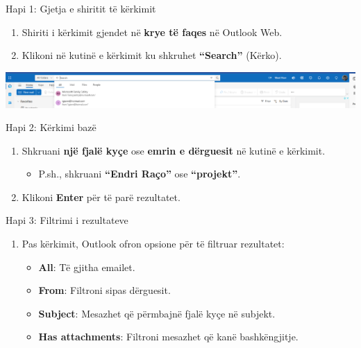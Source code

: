 \documentclass[
  ignorenonframetext,
]{beamer}
\providecommand{\tightlist}{%
  \setlength{\itemsep}{0pt}\setlength{\parskip}{0pt}}
\begin{document}
\begin{frame}{Hapi 1: Gjetja e shiritit të kërkimit}
\label{hapi-1-gjetja-e-shiritit-tuxeb-kuxebrkimit}
\begin{enumerate}
\item
  Shiriti i kërkimit gjendet në \textbf{krye të faqes} në Outlook Web.
\item
  Klikoni në kutinë e kërkimit ku shkruhet \textbf{``Search''} (Kërko).
\end{enumerate}

\includegraphics{./images/outlook18.png}
\end{frame}

\begin{frame}{Hapi 2: Kërkimi bazë}
\label{hapi-2-kuxebrkimi-bazuxeb}
\begin{enumerate}
\item
  Shkruani \textbf{një fjalë kyçe} ose \textbf{emrin e dërguesit} në
  kutinë e kërkimit.

  \begin{itemize}
  \tightlist
  \item
    P.sh., shkruani \textbf{``Endri Raço''} ose \textbf{``projekt''}.
  \end{itemize}
\item
  Klikoni \textbf{Enter} për të parë rezultatet.
\end{enumerate}
\end{frame}

\begin{frame}{Hapi 3: Filtrimi i rezultateve}
\label{hapi-3-filtrimi-i-rezultateve}
\begin{enumerate}
\item
  Pas kërkimit, Outlook ofron opsione për të filtruar rezultatet:

  \begin{itemize}
  \item
    \textbf{All}: Të gjitha emailet.
  \item
    \textbf{From}: Filtroni sipas dërguesit.
  \item
    \textbf{Subject}: Mesazhet që përmbajnë fjalë kyçe në subjekt.
  \item
    \textbf{Has attachments}: Filtroni mesazhet që kanë bashkëngjitje.
  \end{itemize}
\end{enumerate}
\end{frame}
\end{document}
